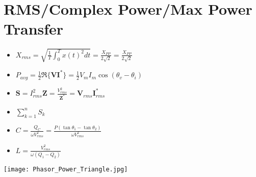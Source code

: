 \section*{RMS/Complex Power/Max Power Transfer} \label{sec:Complex Power}
	\vspace{-6mm}
	\begin{multicols}{2}
		\begin{itemize}[noitemsep]
			\item $X_{rms}=\sqrt{\frac{1}{T} \int_{0}^{T} x(t)^2 dt}=\frac{X_{PP}}{2 \sqrt{2}}=\frac{X_{PP}}{2 \sqrt{2}}$
			\item $P_{avg}=\frac{1}{2} \Re\lbrace \mathbf{V} \mathbf{I}^* \rbrace=\frac{1}{2}V_{m}I_{m}\cos \left(\theta_v -\theta_i \right)$
			\item $\mathbf{S} = I_{rms}^2\mathbf{Z} = \frac{V_{rms}^2}{\mathbf{Z}^*} = \mathbf{V}_{rms}\mathbf{I}_{rms}^*$ \vspace{1.2mm}
			\item $\sum_{k=1}^{n} S_{k}$ \vspace{1.2mm}
			\item $C = \frac{Q_{C}}{\omega V_{rms}^2} = \frac{P\left( \tan \theta_1 - \tan \theta_2 \right)}{\omega V_{rms}^2}$ \vspace{1.2mm}
			\item $L=\frac{V_{rms}^2}{\omega \left(Q_1 - Q_2 \right)}$
		\end{itemize}

		\columnbreak
		
		\texttt{[image: Phasor\_Power\_Triangle.jpg]} %
		\label{fig:Phasor/Power Triangle}
	\end{multicols}
	\vspace{-4mm}

